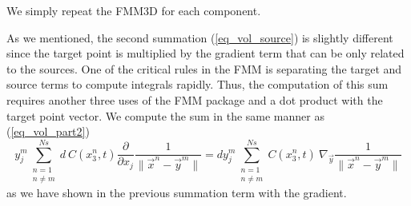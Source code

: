 We simply repeat the FMM3D for each component. 
\par
As we mentioned, the second summation (\ref{eq_vol_source}) is slightly different since the target point is multiplied by the gradient term that can be only related to the sources. One of the critical rules in the FMM is separating the target and source terms to compute integrals rapidly. Thus, the computation of this sum requires another three uses of the FMM package and a dot product with the target point vector.
We compute the sum in the same manner as (\ref{eq_vol_part2})
\begin{equation}
	y_j^m  
	\sum_{\substack{n=1 \\ n \neq m}}^{Ns} 
	d \ {C}(x_3^n, t)
	\frac{\partial}{\partial x_j}
	\frac{1}{\| \vec{x}^n - \vec{y}^m \|} 
	= d y_j^m  
	\sum_{\substack{n=1 \\ n \neq m}}^{Ns}  
	{C}(x_3^n, t) \
	\nabla_{\vec{y}} 
	\frac{1}{\| \vec{x}^n - \vec{y}^m\|}
\end{equation}
as we have shown in the previous summation term with the gradient. 
